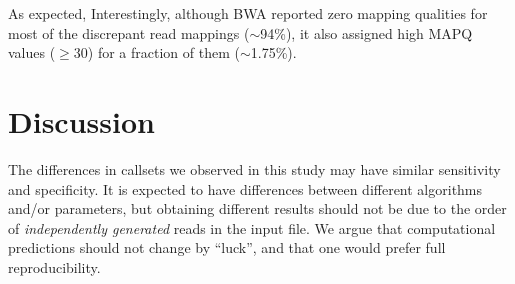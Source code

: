 \documentclass[10pt,a4paper]{article}
\begin{document}
As expected, 
Interestingly, although BWA reported zero mapping qualities for 
most of the discrepant read mappings ($\sim$94\%), it also assigned high MAPQ values ($\geq$30) for a fraction of them ($\sim$1.75\%). 


\section{Discussion}

The differences in callsets we observed in this study 
may have similar sensitivity and specificity. It is expected to
have differences between different algorithms and/or parameters, but
obtaining different results should not be due to the order of {\it independently generated} reads in the input file. 
We argue that computational predictions should not change by ``luck'', and that 
one would prefer full reproducibility. 



\small



\end{document}

